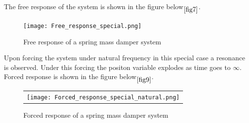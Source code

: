\documentclass[11pt]{article}
\begin{document}
The free response of the system is shown in the figure below$\phantom{}_{\ref{fig7}}$.

\begin{figure}[H]
	\centering
	\centering
	\texttt{[image: Free\_response\_special.png]}
	\caption{Free response of a spring mass damper system}
\end{figure}
\label{fig7}

\noindent Upon forcing the system under natural frequency in this special case a resonance is observed. Under this
forcing the positon variable explodes as time goes to $\infty$.\\
Forced response is shown in the figure below$\phantom{}_{\ref{fig9}}$.


\begin{figure}[H]
	\centering
	\begin{tabular} {l}
	\texttt{[image: Forced\_response\_special\_natural.png]} 
	\end{tabular}
	\caption{Forced response of a spring mass damper system}
\end{figure}
\label{fig9} 



{}

 
\end{document}
